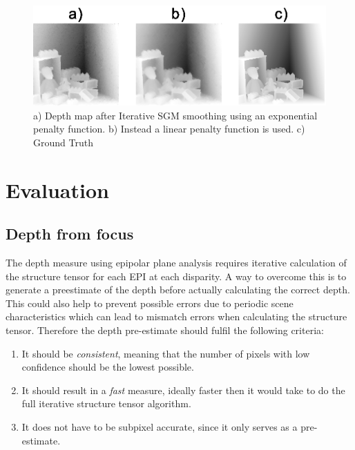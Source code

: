 \documentclass  [
  paper    = a4,
  BCOR     = 10mm,
  twoside,
  fontsize = 12pt,
  fleqn,
  toc      = bibnumbered,
  toc      = listofnumbered,
  numbers  = noendperiod,
  headings = normal,
  listof   = leveldown,
  version  = 3.03
]                                       {scrreprt}
\begin{document}
\begin{figure}
	\centering
	\includegraphics[width=1\linewidth]{images/linear_iteration}
	\caption[Linear Cost function results]{a) Depth map after Iterative SGM smoothing using an exponential penalty function. b) Instead a linear penalty function is used. c) Ground Truth}
	\label{fig:lineariteration}
\end{figure}


\chapter{Evaluation}
\label{Evaluation}
\section{Depth from focus}
\label{sec: depth from focus}
The depth measure using epipolar plane analysis requires iterative calculation of the structure tensor for each EPI at each disparity. A way to overcome this is to generate a preestimate of the depth before actually calculating the correct depth. This could also help to prevent possible errors due to periodic scene characteristics which can lead to mismatch errors when calculating the structure tensor. Therefore the depth pre-estimate should fulfil the following criteria:
\begin{enumerate}
	\item It should be \textit{consistent}, meaning that the number of pixels with low confidence should be the lowest possible.
	\item It should result in a \textit{fast} measure, ideally faster then it would take to do the full iterative structure tensor algorithm.
	\item It does not have to be subpixel accurate, since it only serves as a pre-estimate. 
\end{enumerate}
\end{document}
